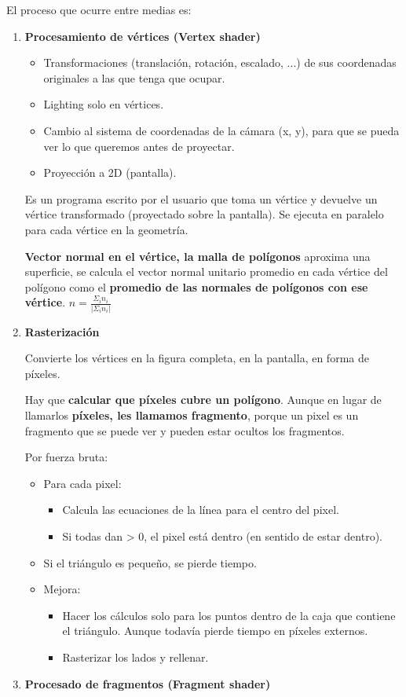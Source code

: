 El proceso que ocurre entre medias es:
\begin{enumerate}
    \item \textbf{Procesamiento de vértices (Vertex shader)}
    \begin{itemize}
        \item Transformaciones (translación, rotación, escalado, ...) de sus coordenadas originales a las que tenga que ocupar.
        \item Lighting solo en vértices.
        \item Cambio al sistema de coordenadas de la cámara (x, y), para que se pueda ver lo que queremos antes de proyectar.
        \item Proyección a 2D (pantalla).
    \end{itemize}

    Es un programa escrito por el usuario que toma un vértice y devuelve un vértice transformado (proyectado sobre la pantalla). Se ejecuta en paralelo para cada vértice en la geometría.

    \textbf{Vector normal en el vértice, la malla de polígonos} aproxima una superficie, se calcula el vector normal unitario promedio en cada vértice del polígono como el \textbf{promedio de las normales de polígonos con ese vértice}. $n= \frac{\Sigma_i n_i}{|\Sigma_i n_i|}$
    \item \textbf{Rasterización}
    
    Convierte los vértices en la figura completa, en la pantalla, en forma de píxeles.

    Hay que \textbf{calcular que píxeles cubre un polígono}. Aunque en lugar de llamarlos \textbf{píxeles, les llamamos fragmento}, porque un pixel es un fragmento que se puede ver y pueden estar ocultos los fragmentos.

    Por fuerza bruta:
    \begin{itemize}
        \item Para cada pixel:
        \begin{itemize}
            \item Calcula las ecuaciones de la línea para el centro del pixel.
            \item Si todas dan > 0, el pixel está dentro (en sentido de estar dentro).
        \end{itemize}
        \item Si el triángulo es pequeño, se pierde tiempo.
        \item Mejora: 
        \begin{itemize}
            \item Hacer los cálculos solo para los puntos dentro de la caja que contiene el triángulo. Aunque todavía pierde tiempo en píxeles externos.
            \item Rasterizar los lados y rellenar.
        \end{itemize}
    \end{itemize}
    \item \textbf{Procesado de fragmentos (Fragment shader)}
    

\end{enumerate}
